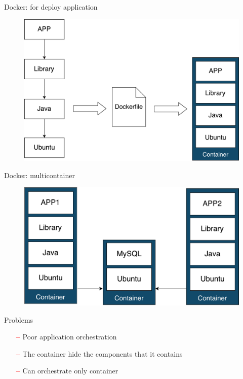 \documentclass{beamer}
\begin{document}
  \begin{frame}{Docker: for deploy application}
    \begin{figure}
      \includegraphics[width=1\textwidth]{img/docker_build.pdf}
    \end{figure}
  \end{frame}

  \begin{frame}{Docker: multicontainer}
    \begin{figure}
      \includegraphics[width=1\textwidth]{img/docker_multicontainer.pdf}
    \end{figure}
  \end{frame}

  \begin{frame}{Problems}
    \begin{itemize}
      \item[\textcolor{red}{\textbf{--}}] Poor application orchestration
      \item[\textcolor{red}{\textbf{--}}] The container hide the components that it contains
      \item[\textcolor{red}{\textbf{--}}] Can orchestrate only container
    \end{itemize}
  \end{frame}
\end{document}
